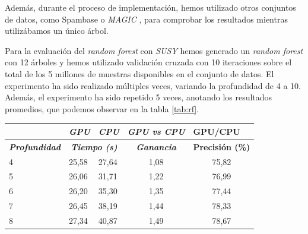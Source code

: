 Además, durante el proceso de implementación, hemos utilizado otros conjuntos de datos, como Spambase \cite{spambase} o \textit{MAGIC} \cite{magic04}, para comprobar los resultados mientras utilizábamos un único árbol.

Para la evaluación del \textit{random forest} con \textit{SUSY} hemos generado un \textit{random forest} con 12 árboles y hemos utilizado validación cruzada con 10 iteraciones sobre el total de los 5 millones de muestras disponibles en el conjunto de datos. El experimento ha sido realizado múltiples veces, variando la profundidad de 4 a 10. Además, el experimento ha sido repetido 5 veces, anotando los resultados promedios, que podemos observar en la tabla \ref{tab:rf}.\\
\begin{table}[ht]
\centering
\begin{tabular}{@{}l|ll|c|c|@{}}
\cmidrule(l){2-5}
\textit{\textbf{}}                                  & \multicolumn{1}{l|}{\textit{\textbf{GPU}}} & \textit{\textbf{CPU}} & \multicolumn{1}{l|}{\textit{\textbf{GPU vs CPU}}} & \multicolumn{1}{l|}{\textbf{GPU/CPU}} \\ \midrule
\multicolumn{1}{|c|}{\textit{\textbf{Profundidad}}} & \multicolumn{2}{c|}{\textit{\textbf{Tiempo (s)}}}                  & \textit{\textbf{Ganancia}}                        & \textbf{Precisión (\%)}               \\ \midrule
\multicolumn{1}{|l|}{4}                             & 25,58                                      & 27,64                 & 1,08                                              & 75,82                                 \\
\multicolumn{1}{|l|}{5}                             & 26,06                                      & 31,71                 & 1,22                                              & 76,99                                 \\
\multicolumn{1}{|l|}{6}                             & 26,20                                      & 35,30                 & 1,35                                              & 77,44                                 \\
\multicolumn{1}{|l|}{7}                             & 26,45                                      & 38,19                 & 1,44                                              & 78,33                                 \\
\multicolumn{1}{|l|}{8}                             & 27,34                                      & 40,87                 & 1,49                                              & 78,67                                 \\

\end{tabular}
\end{table}
